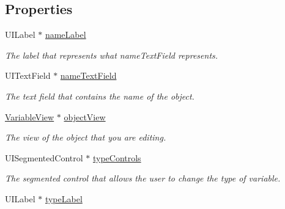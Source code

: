 \subsection*{Properties}
\begin{DoxyCompactItemize}
\item 
\hypertarget{interface_variable_edit_menu_view_af91fc4ee7ce5ce8ac3b0f00e38824b04}{U\-I\-Label $\ast$ \hyperlink{interface_variable_edit_menu_view_af91fc4ee7ce5ce8ac3b0f00e38824b04}{name\-Label}}\label{interface_variable_edit_menu_view_af91fc4ee7ce5ce8ac3b0f00e38824b04}

\begin{DoxyCompactList}\small\item\em The label that represents what name\-Text\-Field represents. \end{DoxyCompactList}\item 
\hypertarget{interface_variable_edit_menu_view_a5cbc9eaf5c10f7b61fa933746ae0bb6e}{U\-I\-Text\-Field $\ast$ \hyperlink{interface_variable_edit_menu_view_a5cbc9eaf5c10f7b61fa933746ae0bb6e}{name\-Text\-Field}}\label{interface_variable_edit_menu_view_a5cbc9eaf5c10f7b61fa933746ae0bb6e}

\begin{DoxyCompactList}\small\item\em The text field that contains the name of the object. \end{DoxyCompactList}\item 
\hypertarget{interface_variable_edit_menu_view_ad87205d9304809167df2212ab8f146e9}{\hyperlink{interface_variable_view}{Variable\-View} $\ast$ \hyperlink{interface_variable_edit_menu_view_ad87205d9304809167df2212ab8f146e9}{object\-View}}\label{interface_variable_edit_menu_view_ad87205d9304809167df2212ab8f146e9}

\begin{DoxyCompactList}\small\item\em The view of the object that you are editing. \end{DoxyCompactList}\item 
\hypertarget{interface_variable_edit_menu_view_a326ccc069e5a0781354c0cc85dc4550d}{U\-I\-Segmented\-Control $\ast$ \hyperlink{interface_variable_edit_menu_view_a326ccc069e5a0781354c0cc85dc4550d}{type\-Controls}}\label{interface_variable_edit_menu_view_a326ccc069e5a0781354c0cc85dc4550d}

\begin{DoxyCompactList}\small\item\em The segmented control that allows the user to change the type of variable. \end{DoxyCompactList}\item 
\hypertarget{interface_variable_edit_menu_view_af06d4a271255059c61da80cfc91f9835}{U\-I\-Label $\ast$ \hyperlink{interface_variable_edit_menu_view_af06d4a271255059c61da80cfc91f9835}{type\-Label}}\label{interface_variable_edit_menu_view_af06d4a271255059c61da80cfc91f9835}


\end{DoxyCompactItemize}
